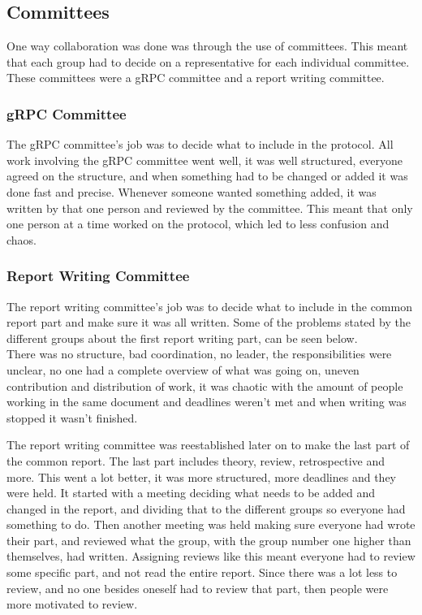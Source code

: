 \subsection{Committees}
One way collaboration was done was through the use of committees.
This meant that each group had to decide on a representative for each individual committee. These committees were a gRPC committee and a report writing committee.

\subsubsection{gRPC Committee}
The gRPC committee's job was to decide what to include in the protocol.
All work involving the gRPC committee went well, it was well structured, everyone agreed on the structure, and when something had to be changed or added it was done fast and precise.
Whenever someone wanted something added, it was written by that one person and reviewed by the committee.
This meant that only one person at a time worked on the protocol, which led to less confusion and chaos.

\subsubsection{Report Writing Committee}
The report writing committee's job was to decide what to include in the common report part and make sure it was all written.
Some of the problems stated by the different groups about the first report writing part, can be seen below.\\
There was no structure, bad coordination, no leader, the responsibilities were unclear, no one had a complete overview of what was going on, uneven contribution and distribution of work, it was chaotic with the amount of people working in the same document and deadlines weren't met and when writing was stopped it wasn't finished.


The report writing committee was reestablished later on to make the last part of the common report. The last part includes theory, review, retrospective and more.
This went a lot better, it was more structured, more deadlines and they were held. 
It started with a meeting deciding what needs to be added and changed in the report, and dividing that to the different groups so everyone had something to do.
Then another meeting was held making sure everyone had wrote their part, and reviewed what the group, with the group number one higher than themselves, had written.
Assigning reviews like this meant everyone had to review some specific part, and not read the entire report. 
Since there was a lot less to review, and no one besides oneself had to review that part, then people were more motivated to review.
